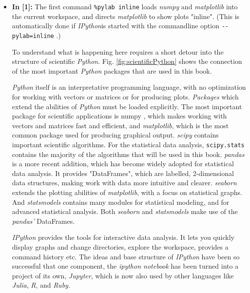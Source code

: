 \begin{itemize}
  \item \textbf{In [1]:} The first command \lstinline{%pylab inline} loads \emph{numpy} and \emph{matplotlib} into the current workspace, and directs \emph{matplotlib} to show plots "inline". (This is automatically done if \emph{IPython}is started with the commandline option \lstinline{--pylab=inline} .)

    To understand what is happening here requires a short detour into the structure of scientific \emph{Python}. Fig. \ref{fig:scientificPython} shows the connection of the most important \emph{Python} packages that are used in this book.

    \emph{Python} itself is an interpretative programming language, with no optimization for working with vectors or matrices or for producing plots. \emph{Packages} which extend the abilities of \emph{Python} must be loaded explicitly. The most important package for scientific applications is \gls{numpy} , which makes working with vectors and matrices fast and efficient, and \emph{matplotlib}, which is the most common package used for producing graphical output. \emph{\gls{scipy}} contains important scientific algorithms. For the statistical data analysis, \texttt{scipy.stats} contains the majority of the algorithms that will be used in this book. \emph{pandas} is a more recent addition, which has become widely adopted for statistical data analysis. It provides "DataFrames", which are labelled, 2-dimensional data structures, making work with data more intuitive and clearer. \emph{seaborn} extends the plotting abilities of \emph{\gls{matplotlib}}, with a focus on statistical graphs. And \emph{statsmodels} contains many modules for statistical modeling, and for advanced statistical analysis. Both \emph{seaborn} and \emph{statsmodels} make use of the \emph{pandas'} DataFrames.

    \emph{IPython} provides the tools for interactive data analysis. It lets you quickly display graphs and change directories, explore the workspace, provides a command history etc. The ideas and base structure of \emph{IPython} have been so successful that one component, the \emph{ipython notebook} has been turned into a project of its own, \emph{Jupyter}, which is now also used by other languages like \emph{Julia}, \emph{R}, and \emph{Ruby}.


\end{itemize}
